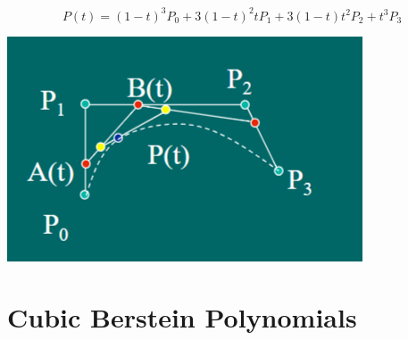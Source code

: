 \documentclass{article}
\begin{document}
\[P(t) = (1 - t)^3 P_0 + 3(1 - t)^2 t P_1 + 3(1 - t) t^2 P_2 + t^3 P_3\]
\begin{center}
    \includegraphics*[scale=1]{W3_4.png}
\end{center}

\section*{Cubic Berstein Polynomials}
\end{document}

